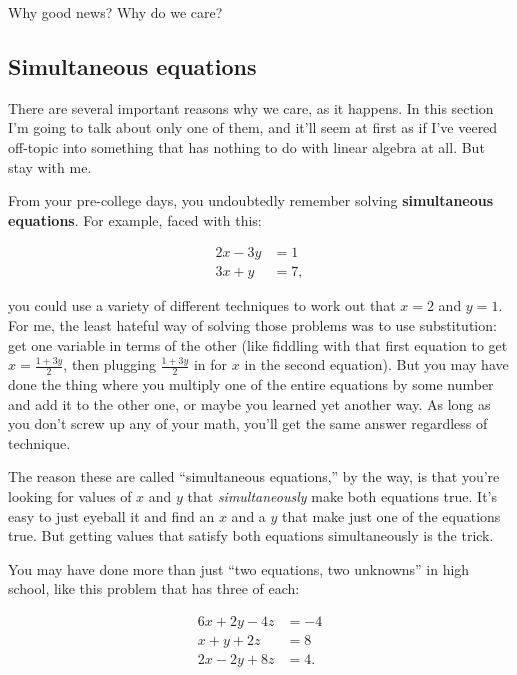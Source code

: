 Why good news? Why do we care?

\subsection{Simultaneous equations}

There are several important reasons why we care, as it happens. In this section
I'm going to talk about only one of them, and it'll seem at first as if I've
veered off-topic into something that has nothing to do with linear algebra at
all. But stay with me.


From your pre-college days, you undoubtedly remember solving
\textbf{simultaneous equations}. For example, faced with this:

\vspace{-.25in}
\begin{align*}
2x - 3y &= 1 \\
3x + y &= 7,
\end{align*}
\vspace{-.25in}

\label{hellaciousAlgebra}

you could use a variety of different techniques to work out that $x=2$ and
$y=1$. For me, the least hateful way of solving those problems was to use
substitution: get one variable in terms of the other (like fiddling with that
first equation to get $x = \frac{1+3y}{2}$, then plugging $\frac{1+3y}{2}$ in
for $x$ in the second equation). But you may have done the thing where you
multiply one of the entire equations by some number and add it to the other
one, or maybe you learned yet another way. As long as you don't screw up any of
your math, you'll get the same answer regardless of technique.

The reason these are called ``simultaneous equations,'' by the way, is that
you're looking for values of $x$ and $y$ that \textit{simultaneously} make both
equations true. It's easy to just eyeball it and find an $x$ and a $y$ that
make just one of the equations true. But getting values that satisfy both
equations simultaneously is the trick.

\smallskip

You may have done more than just ``two equations, two unknowns'' in high
school, like this problem that has three of each:

\vspace{-.25in}
\begin{align*}
6x + 2y - 4z &= -4 \\
x + y + 2z &= 8 \\
2x - 2y + 8z &= 4.
\end{align*}
\vspace{-.25in}

